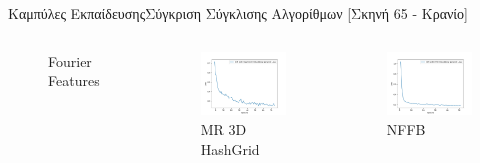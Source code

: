 \documentclass[10pt]{beamer}
\begin{document}
\begin{frame}{Καμπύλες Εκπαίδευσης}{Σύγκριση Σύγκλισης Αλγορίθμων [Σκηνή 65 - Κρανίο]}
\begin{columns}[T]
\begin{figure}
            \caption{Fourier Features}
            \end{figure}
            \begin{figure}
            \includegraphics[height = .2\textheight]{images/chapter5_img/LossPlots/Total_Loss_First_50-100_Epochs/loss_plot_HashGrid_EpochStamp75.jpg}
            \caption{MR 3D HashGrid}
            \end{figure}
            \begin{figure}
            \includegraphics[height = .2\textheight]{images/chapter5_img/LossPlots/Total_Loss_First_50-100_Epochs/loss_plot_FFB.jpg}
            \caption{NFFB}
            \end{figure}

\end{columns}
\end{frame}
\end{document}
